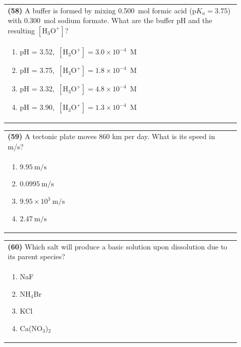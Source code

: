 \documentclass{article}
\begin{document}
\noindent\begin{tabular}{|p{0.9\linewidth}|}
\hline
\textbf{(58)} A buffer is formed by mixing 0.500~mol formic acid (p$K_a=3.75$) with 0.300~mol sodium formate. What are the buffer pH and the resulting $[\mathrm{H_3O^+}]$?\\[0.2cm]
\begin{minipage}[t]{0.85\linewidth}
\begin{enumerate}[label=\alph*.]
\item pH = 3.52,\ $[\mathrm{H_3O^+}] = 3.0\times10^{-4}$~M
\item pH = 3.75,\ $[\mathrm{H_3O^+}] = 1.8\times10^{-4}$~M
\item pH = 3.32,\ $[\mathrm{H_3O^+}] = 4.8\times10^{-4}$~M
\item pH = 3.90,\ $[\mathrm{H_3O^+}] = 1.3\times10^{-4}$~M
\end{enumerate}
\end{minipage}\\[0.2cm]
\hline
\end{tabular}

\noindent\begin{tabular}{|p{0.9\linewidth}|}
\hline
\textbf{(59)} A tectonic plate moves 860 km per day. What is its speed in m/s? \\
\begin{minipage}[t]{0.85\linewidth}
\begin{enumerate}[label=\alph*.]
    \item $9.95~\text{m/s}$
    \item $0.0995~\text{m/s}$
    \item $9.95 \times 10^3~\text{m/s}$
    \item $2.47~\text{m/s}$
\end{enumerate}
\end{minipage}\\[0.2cm]
\hline
\end{tabular}

\noindent\begin{tabular}{|p{0.9\linewidth}|}
\hline
\textbf{(60)} Which salt will produce a basic solution upon dissolution due to its parent species? \\[0.2cm]
\begin{minipage}{0.85\linewidth}
\begin{enumerate}[label=\alph*.]
\item NaF \item NH$_4$Br \item KCl \item Ca(NO$_3$)$_2$
\end{enumerate}
\end{minipage}\\[0.2cm]
\hline
\end{tabular}
\end{document}
